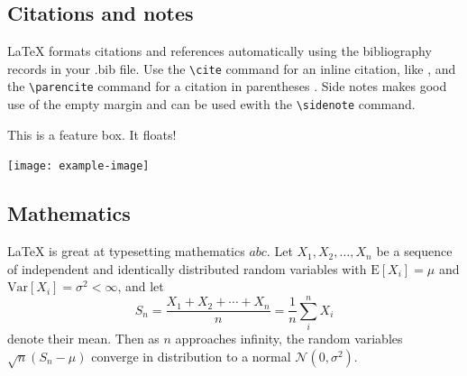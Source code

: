 \begin{figure}
\begin{fullwidth}
    \end{fullwidth}
\end{figure}

\subsection{Citations and notes}

LaTeX formats citations and references automatically using the bibliography records in your .bib file. Use the \verb|\cite| command for an inline citation, like \cite{Pooley2021}, and the \verb|\parencite| command for a citation in parentheses \parencite{Brembs2021}. Side notes makes good use of the empty margin and can be used ewith the \verb|\sidenote| command. 


\begin{featurebox}
\caption{This is an example feature box}
\label{box:simple}
This is a feature box. It floats!
\medskip

\texttt{[image: example-image]}

\lipsum[1]
\end{featurebox}

\subsection{Mathematics}

\LaTeX{} is great at typesetting mathematics $abc$. Let $X_1, X_2, \ldots, X_n$ be a sequence of independent and identically distributed random variables with $\text{E}[X_i] = \mu$ and $\text{Var}[X_i] = \sigma^2 < \infty$, and let
\begin{equation}
\label{eq:CLT}
S_n = \frac{X_1 + X_2 + \cdots + X_n}{n}
      = \frac{1}{n}\sum_{i}^{n} X_i
\end{equation}
denote their mean. Then as $n$ approaches infinity, the random variables $\sqrt{n}(S_n - \mu)$ converge in distribution to a normal $\mathcal{N}(0, \sigma^2)$.

\lipsum[3] 

